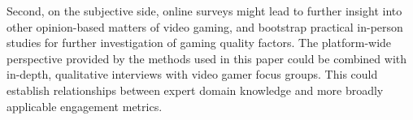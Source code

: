Second, on the subjective side, online surveys might lead to further
insight into other opinion-based matters of video gaming, and bootstrap
practical in-person studies for further investigation of gaming quality
factors.
The platform-wide perspective provided by the methods used in
this paper could be combined with in-depth, qualitative interviews with
video gamer focus groups. This could establish relationships between
expert domain knowledge and more broadly applicable engagement metrics.
